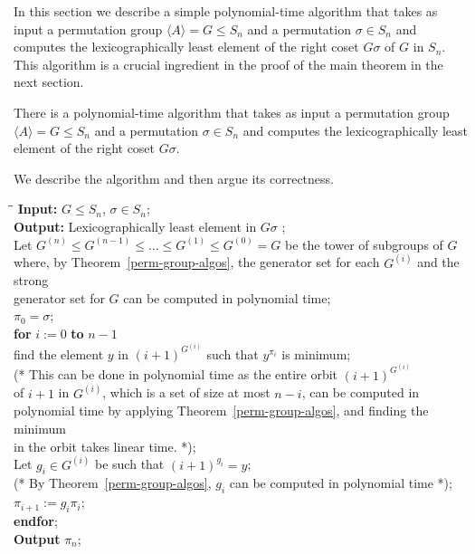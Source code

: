 \documentclass{elsart}
\newcommand{\KW}[1]{{\bf #1}}
\renewcommand{\angle}[1]{\langle #1\rangle}
\begin{document}
In this section we describe a simple polynomial-time algorithm that
takes as input a permutation group $\angle{A}=G \leq S_n$ and a
permutation $\sigma\in S_n$ and computes the lexicographically least
element of the right coset $G \sigma$ of $G$ in $S_n$. This algorithm
is a crucial ingredient in the proof of the main theorem in the next
section.

\begin{thm}\label{lexleast}
  There is a polynomial-time algorithm that takes as input a
  permutation group $\angle{A}=G \leq S_n$ and a permutation
  $\sigma\in S_n$ and computes the lexicographically least element of
  the right coset $G \sigma$.
\end{thm}

\begin{pf}

 We describe the algorithm and then argue its correctness.

\begin{tabbing}
\quad \=\quad \=\quad                        \kill
{\bf Input:} $G \leq S_n$, $\sigma \in S_n$; \\
{\bf Output:} Lexicographically least element in $G \sigma$ ; \\
Let $G^{(n)}\leq G^{(n-1)}\leq\ldots\leq G^{(1)}\leq G^{(0)}=G$ be the
tower of subgroups of $G$\\ where, by Theorem~\ref{perm-group-algos}, the
generator set for each $G^{(i)}$ and the strong\\ generator set for $G$
can be computed in polynomial time;\\
$\pi_0 = \sigma$;\\
\> \KW{for} $i := 0$ \KW{to} $n-1$\\
\> \> find the element $y$ in $(i+1)^{G^{(i)}}$ such that
                $y^{\pi_i}$ is minimum;\\
\> \> (* This can be done in polynomial time as the entire orbit 
$(i+1)^{G^{(i)}}$\\
\> \>  of $i+1$ in $G^{(i)}$,  which is a set of size at most $n-i$, 
can be computed in\\
\> \>  polynomial time by applying Theorem~\ref{perm-group-algos}, 
and finding  the minimum \\
\> \> in the orbit takes linear time. *);\\
\> \> Let $g_i \in G^{(i)}$ be such that $(i+1)^{g_i} = y$;\\
\> \> (* By Theorem~\ref{perm-group-algos}, $g_i$ can be computed in
polynomial time *);\\
\> \>                $\pi_{i+1} := g_i \pi_i$;\\
\> \KW{endfor};\\        
\KW{Output} $\pi_n$;\\
\end{tabbing}


\end{pf}
\end{document}
